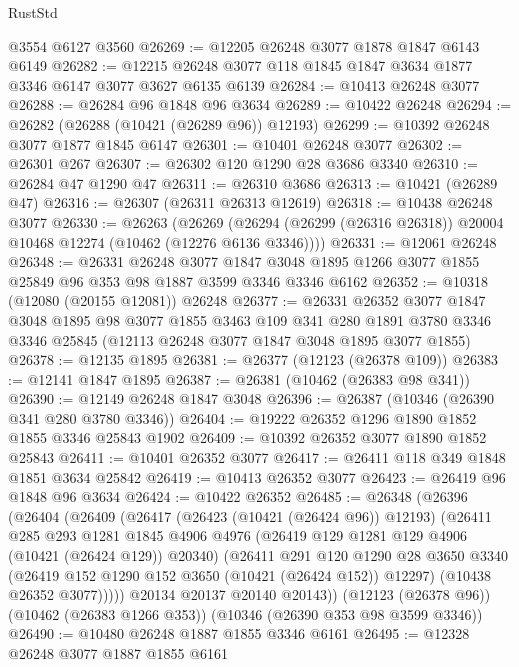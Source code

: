 \begin{lexlean}{RustStd}
\begin{coremodule}
    @3554
    @6127
    @3560
@26269 := @12205 @26248 @3077 @1878 @1847 @6143 @6149
@26282 := @12215 @26248 @3077 @118 @1845 @1847 @3634 @1877 @3346 @6147 @3077 @3627 @6135 @6139
@26284 := @10413 @26248 @3077
@26288 := @26284 @96 @1848 @96 @3634
@26289 := @10422 @26248
@26294 := @26282 (@26288 (@10421 (@26289 @96)) @12193)
@26299 := @10392 @26248 @3077 @1877 @1845 @6147
@26301 := @10401 @26248 @3077
@26302 := @26301 @267
@26307 := @26302 @120 @1290 @28 @3686 @3340
@26310 := @26284 @47 @1290 @47
@26311 := @26310 @3686
@26313 := @10421 (@26289 @47)
@26316 := @26307 (@26311 @26313 @12619)
@26318 := @10438 @26248 @3077
@26330 := @26263
    (@26269 (@26294 (@26299 (@26316 @26318)) @20004 @10468 @12274 (@10462 (@12276 @6136 @3346))))
@26331 := @12061 @26248
@26348 := @26331
    @26248
    @3077
    @1847
    @3048
    @1895
    @1266
    @3077
    @1855
    @25849
    @96
    @353
    @98
    @1887
    @3599
    @3346
    @3346
    @6162
@26352 := @10318 (@12080 (@20155 @12081)) @26248
@26377 := @26331
    @26352
    @3077
    @1847
    @3048
    @1895
    @98
    @3077
    @1855
    @3463
    @109
    @341
    @280
    @1891
    @3780
    @3346
    @3346
    @25845
    (@12113 @26248 @3077 @1847 @3048 @1895 @3077 @1855)
@26378 := @12135 @1895
@26381 := @26377 (@12123 (@26378 @109))
@26383 := @12141 @1847 @1895
@26387 := @26381 (@10462 (@26383 @98 @341))
@26390 := @12149 @26248 @1847 @3048
@26396 := @26387 (@10346 (@26390 @341 @280 @3780 @3346))
@26404 := @19222 @26352 @1296 @1890 @1852 @1855 @3346 @25843 @1902
@26409 := @10392 @26352 @3077 @1890 @1852 @25843
@26411 := @10401 @26352 @3077
@26417 := @26411 @118 @349 @1848 @1851 @3634 @25842
@26419 := @10413 @26352 @3077
@26423 := @26419 @96 @1848 @96 @3634
@26424 := @10422 @26352
@26485 := @26348
    (@26396
      (@26404
        (@26409
          (@26417
            (@26423 (@10421 (@26424 @96)) @12193)
            (@26411
              @285
              @293
              @1281
              @1845
              @4906
              @4976
              (@26419 @129 @1281 @129 @4906 (@10421 (@26424 @129)) @20340)
              (@26411
                @291
                @120
                @1290
                @28
                @3650
                @3340
                (@26419 @152 @1290 @152 @3650 (@10421 (@26424 @152)) @12297)
                (@10438 @26352 @3077)))))
        @20134
        @20137
        @20140
        @20143))
    (@12123 (@26378 @96))
    (@10462 (@26383 @1266 @353))
    (@10346 (@26390 @353 @98 @3599 @3346))
@26490 := @10480 @26248 @1887 @1855 @3346 @6161
@26495 := @12328 @26248 @3077 @1887 @1855 @6161

\end{coremodule}
\end{lexlean}
